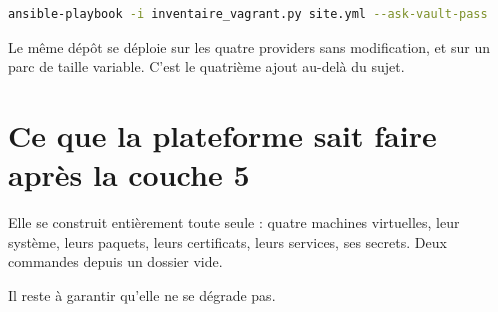 \begin{lstlisting}[language=bash]
ansible-playbook -i inventaire_vagrant.py site.yml --ask-vault-pass
\end{lstlisting}

\apport
Le même dépôt se déploie sur les quatre providers sans modification, et sur un
parc de taille variable. C'est le quatrième ajout au-delà du sujet.

\section*{Ce que la plateforme sait faire après la couche 5}

Elle se construit entièrement toute seule : quatre machines virtuelles, leur
système, leurs paquets, leurs certificats, leurs services, ses secrets. Deux
commandes depuis un dossier vide.

Il reste à garantir qu'elle ne se dégrade pas.
